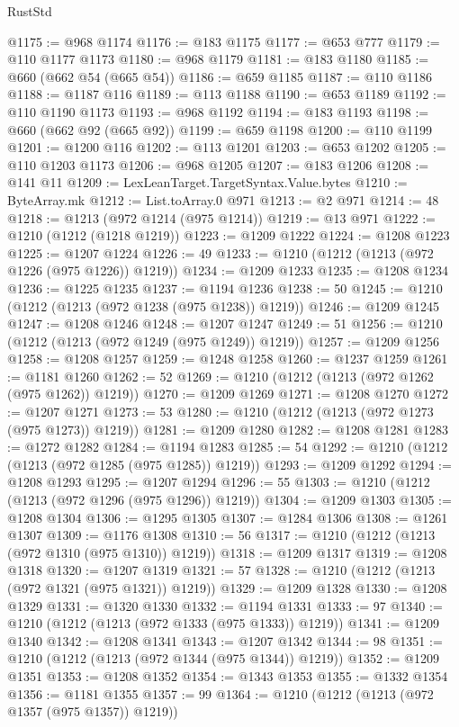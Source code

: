 \begin{lexlean}{RustStd}
\begin{coremodule}
@1175 := @968 @1174
@1176 := @183 @1175
@1177 := @653 @777
@1179 := @110 @1177 @1173
@1180 := @968 @1179
@1181 := @183 @1180
@1185 := @660 (@662 @54 (@665 @54))
@1186 := @659 @1185
@1187 := @110 @1186
@1188 := @1187 @116
@1189 := @113 @1188
@1190 := @653 @1189
@1192 := @110 @1190 @1173
@1193 := @968 @1192
@1194 := @183 @1193
@1198 := @660 (@662 @92 (@665 @92))
@1199 := @659 @1198
@1200 := @110 @1199
@1201 := @1200 @116
@1202 := @113 @1201
@1203 := @653 @1202
@1205 := @110 @1203 @1173
@1206 := @968 @1205
@1207 := @183 @1206
@1208 := @141 @11
@1209 := LexLeanTarget.TargetSyntax.Value.bytes
@1210 := ByteArray.mk
@1212 := List.toArray.{0} @971
@1213 := @2 @971
@1214 := 48
@1218 := @1213 (@972 @1214 (@975 @1214))
@1219 := @13 @971
@1222 := @1210 (@1212 (@1218 @1219))
@1223 := @1209 @1222
@1224 := @1208 @1223
@1225 := @1207 @1224
@1226 := 49
@1233 := @1210 (@1212 (@1213 (@972 @1226 (@975 @1226)) @1219))
@1234 := @1209 @1233
@1235 := @1208 @1234
@1236 := @1225 @1235
@1237 := @1194 @1236
@1238 := 50
@1245 := @1210 (@1212 (@1213 (@972 @1238 (@975 @1238)) @1219))
@1246 := @1209 @1245
@1247 := @1208 @1246
@1248 := @1207 @1247
@1249 := 51
@1256 := @1210 (@1212 (@1213 (@972 @1249 (@975 @1249)) @1219))
@1257 := @1209 @1256
@1258 := @1208 @1257
@1259 := @1248 @1258
@1260 := @1237 @1259
@1261 := @1181 @1260
@1262 := 52
@1269 := @1210 (@1212 (@1213 (@972 @1262 (@975 @1262)) @1219))
@1270 := @1209 @1269
@1271 := @1208 @1270
@1272 := @1207 @1271
@1273 := 53
@1280 := @1210 (@1212 (@1213 (@972 @1273 (@975 @1273)) @1219))
@1281 := @1209 @1280
@1282 := @1208 @1281
@1283 := @1272 @1282
@1284 := @1194 @1283
@1285 := 54
@1292 := @1210 (@1212 (@1213 (@972 @1285 (@975 @1285)) @1219))
@1293 := @1209 @1292
@1294 := @1208 @1293
@1295 := @1207 @1294
@1296 := 55
@1303 := @1210 (@1212 (@1213 (@972 @1296 (@975 @1296)) @1219))
@1304 := @1209 @1303
@1305 := @1208 @1304
@1306 := @1295 @1305
@1307 := @1284 @1306
@1308 := @1261 @1307
@1309 := @1176 @1308
@1310 := 56
@1317 := @1210 (@1212 (@1213 (@972 @1310 (@975 @1310)) @1219))
@1318 := @1209 @1317
@1319 := @1208 @1318
@1320 := @1207 @1319
@1321 := 57
@1328 := @1210 (@1212 (@1213 (@972 @1321 (@975 @1321)) @1219))
@1329 := @1209 @1328
@1330 := @1208 @1329
@1331 := @1320 @1330
@1332 := @1194 @1331
@1333 := 97
@1340 := @1210 (@1212 (@1213 (@972 @1333 (@975 @1333)) @1219))
@1341 := @1209 @1340
@1342 := @1208 @1341
@1343 := @1207 @1342
@1344 := 98
@1351 := @1210 (@1212 (@1213 (@972 @1344 (@975 @1344)) @1219))
@1352 := @1209 @1351
@1353 := @1208 @1352
@1354 := @1343 @1353
@1355 := @1332 @1354
@1356 := @1181 @1355
@1357 := 99
@1364 := @1210 (@1212 (@1213 (@972 @1357 (@975 @1357)) @1219))

\end{coremodule}
\end{lexlean}
